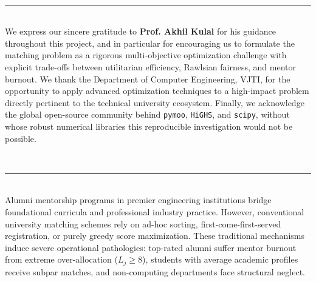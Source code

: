 \documentclass[11pt,a4paper,oneside]{report}
\begin{document}
\newpage

\\[0.2cm]
\noindent\textcolor{ruleGold}{\rule{\textwidth}{1.5pt}}\\[0.6cm]

We express our sincere gratitude to \textbf{Prof. Akhil Kulal} for his guidance throughout this project, and in particular for encouraging us to formulate the matching problem as a rigorous multi-objective optimization challenge with explicit trade-offs between utilitarian efficiency, Rawlsian fairness, and mentor burnout. We thank the Department of Computer Engineering, VJTI, for the opportunity to apply advanced optimization techniques to a high-impact problem directly pertinent to the technical university ecosystem. Finally, we acknowledge the global open-source community behind \texttt{pymoo}, \texttt{HiGHS}, and \texttt{scipy}, without whose robust numerical libraries this reproducible investigation would not be possible.\\[1.5cm]

\newpage

\\[0.2cm]
\noindent\textcolor{ruleGold}{\rule{\textwidth}{1.5pt}}\\[0.6cm]

Alumni mentorship programs in premier engineering institutions bridge foundational curricula and professional industry practice. However, conventional university matching schemes rely on ad-hoc sorting, first-come-first-served registration, or purely greedy score maximization. These traditional mechanisms induce severe operational pathologies: top-rated alumni suffer mentor burnout from extreme over-allocation ($L_j \ge 8$), students with average academic profiles receive subpar matches, and non-computing departments face structural neglect.
\end{document}
